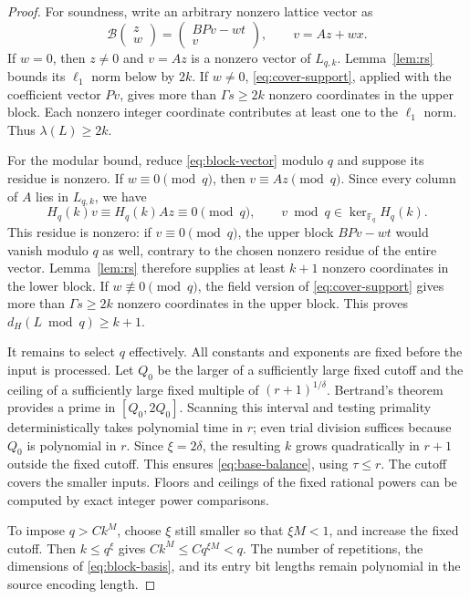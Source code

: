 \documentclass[11pt,letterpaper]{article}
\numberwithin{equation}{section}
\theoremstyle{definition}
\theoremstyle{remark}
\newcommand{\F}{\mathbb F}
\newcommand{\cB}{\mathcal B}
\begin{document}
\begin{proof}
For soundness, write an arbitrary nonzero lattice vector as
\begin{equation}\label{eq:block-vector}
 \cB\begin{pmatrix}z\\w\end{pmatrix}
 =\begin{pmatrix}BPv-wt\\v\end{pmatrix},
 \qquad v=Az+wx.
\end{equation}
If $w=0$, then $z\ne0$ and $v=Az$ is a nonzero vector of $L_{q,k}$. Lemma~\ref{lem:rs} bounds its $\ell_1$ norm below by $2k$. If $w\ne0$, \eqref{eq:cover-support}, applied with the coefficient vector $Pv$, gives more than $\Gamma s\ge2k$ nonzero coordinates in the upper block. Each nonzero integer coordinate contributes at least one to the $\ell_1$ norm. Thus $\lambda(L)\ge2k$.

For the modular bound, reduce \eqref{eq:block-vector} modulo $q$ and suppose its residue is nonzero. If $w\equiv0\pmod q$, then $v\equiv Az\pmod q$. Since every column of $A$ lies in $L_{q,k}$, we have
\[
 H_q(k)v\equiv H_q(k)Az\equiv0\pmod q,
 \qquad v\bmod q\in\ker_{\F_q}H_q(k).
\]
This residue is nonzero: if $v\equiv0\pmod q$, the upper block $BPv-wt$ would vanish modulo $q$ as well, contrary to the chosen nonzero residue of the entire vector. Lemma~\ref{lem:rs} therefore supplies at least $k+1$ nonzero coordinates in the lower block. If $w\not\equiv0\pmod q$, the field version of \eqref{eq:cover-support} gives more than $\Gamma s\ge2k$ nonzero coordinates in the upper block. This proves $d_H(L\bmod q)\ge k+1$.

It remains to select $q$ effectively. All constants and exponents are fixed before the input is processed. Let $Q_0$ be the larger of a sufficiently large fixed cutoff and the ceiling of a sufficiently large fixed multiple of $(r+1)^{1/\delta}$. Bertrand's theorem provides a prime in $[Q_0,2Q_0]$. Scanning this interval and testing primality deterministically takes polynomial time in $r$; even trial division suffices because $Q_0$ is polynomial in $r$. Since $\xi=2\delta$, the resulting $k$ grows quadratically in $r+1$ outside the fixed cutoff. This ensures \eqref{eq:base-balance}, using $\tau\le r$. The cutoff covers the smaller inputs. Floors and ceilings of the fixed rational powers can be computed by exact integer power comparisons.

To impose $q>Ck^M$, choose $\xi$ still smaller so that $\xi M<1$, and increase the fixed cutoff. Then $k\le q^\xi$ gives $Ck^M\le Cq^{\xi M}<q$. The number of repetitions, the dimensions of \eqref{eq:block-basis}, and its entry bit lengths remain polynomial in the source encoding length.
\end{proof}
\end{document}
